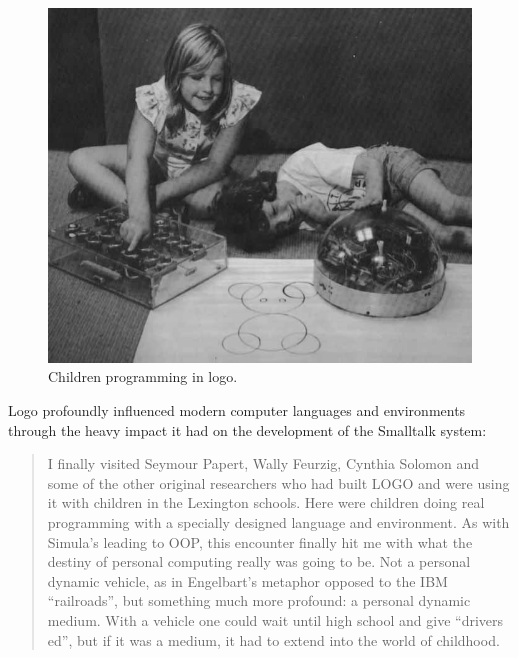 \begin{figure}
  \begin{center}
    \includegraphics[scale=0.7]{images/mindstorms_turtle.jpg}
  \end{center}
  \caption{Children programming in logo. \cite{education:papert_mindstorms}}
\end{figure}

Logo profoundly influenced modern computer languages and environments
through the heavy impact it had on the development of the Smalltalk
system:

\begin{quotation}
  
  I finally visited Seymour Papert, Wally Feurzig, Cynthia Solomon and
  some of the other original researchers who had built LOGO and were
  using it with children in the Lexington schools. Here were children
  doing real programming with a specially designed language and
  environment. As with Simula's leading to OOP, this encounter finally
  hit me with what the destiny of personal computing really was going
  to be. Not a personal dynamic vehicle, as in Engelbart's metaphor
  opposed to the IBM ``railroads'', but something much more profound: a
  personal dynamic medium. With a vehicle one could wait until high
  school and give ``drivers ed'', but if it was a medium, it had to
  extend into the world of childhood. 
  \cite{smalltalk:kay_alan__early_history_smalltalk}

\end{quotation}
